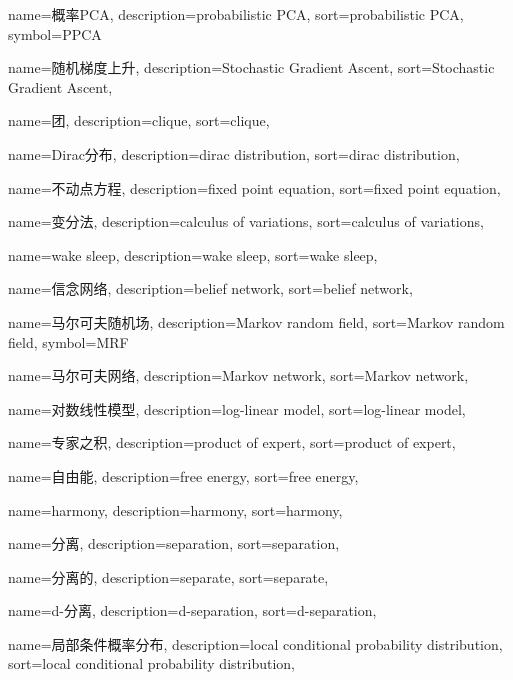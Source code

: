 {
  name=概率PCA,
  description={probabilistic PCA},
  sort={probabilistic PCA},
  symbol={PPCA}
}

{
  name=随机梯度上升,
  description={Stochastic Gradient Ascent},
  sort={Stochastic Gradient Ascent},
}

{
  name=团,
  description={clique},
  sort={clique},
}

{
  name=Dirac分布,
  description={dirac distribution},
  sort={dirac distribution},
}

{
  name=不动点方程,
  description={fixed point equation},
  sort={fixed point equation},
}

{
  name=变分法,
  description={calculus of variations},
  sort={calculus of variations},
}

{
  name=wake sleep,
  description={wake sleep},
  sort={wake sleep},
}

{
  name=信念网络,
  description={belief network},
  sort={belief network},
}

{
  name=马尔可夫随机场,
  description={Markov random field},
  sort={Markov random field},
  symbol={MRF}
}

{
  name=马尔可夫网络,
  description={Markov network},
  sort={Markov network},
}

{
  name=对数线性模型,
  description={log-linear model},
  sort={log-linear model},
}

{
  name=专家之积,
  description={product of expert},
  sort={product of expert},
}

{
  name=自由能,
  description={free energy},
  sort={free energy},
}

{
  name=harmony,
  description={harmony},
  sort={harmony},
}

{
  name=分离,
  description={separation},
  sort={separation},
}

{
	name=分离的,
	description={separate},
	sort={separate},
}

{
  name=d-分离,
  description={d-separation},
  sort={d-separation},
}

{
  name=局部条件概率分布,
  description={local conditional probability distribution},
  sort={local conditional probability distribution},
}

